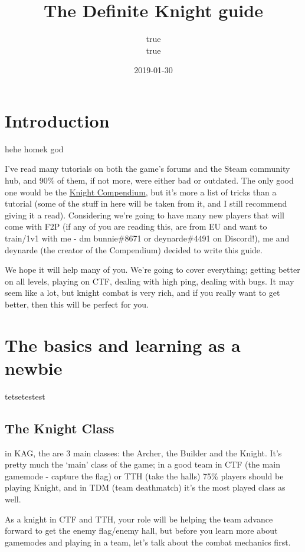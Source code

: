 \documentclass[]{book}
\title{The Definite Knight guide}
\author{true \\ true}
\date{2019-01-30}
\begin{document}
\maketitle

{
\setcounter{tocdepth}{1}
\tableofcontents
}
\chapter{Introduction}\label{introduction}

hehe homek god

I've read many tutorials on both the game's forums and the Steam
community hub, and 90\% of them, if not more, were either bad or
outdated. The only good one would be the
\href{https://deynarde.github.io/kag-knight-compendium/}{Knight
Compendium}, but it's more a list of tricks than a tutorial (some of the
stuff in here will be taken from it, and I still recommend giving it a
read). Considering we're going to have many new players that will come
with F2P (if any of you are reading this, are from EU and want to
train/1v1 with me - dm bunnie\#8671 or deynarde\#4491 on Discord!), me
and deynarde (the creator of the Compendium) decided to write this
guide.

We hope it will help many of you. We're going to cover everything;
getting better on all levels, playing on CTF, dealing with high ping,
dealing with bugs. It may seem like a lot, but knight combat is very
rich, and if you really want to get better, then this will be perfect
for you.

\chapter{The basics and learning as a
newbie}\label{the-basics-and-learning-as-a-newbie}

tetsetestest

\section{The Knight Class}\label{the-knight-class}

in KAG, the are 3 main classes: the Archer, the Builder and the Knight.
It's pretty much the `main' class of the game; in a good team in CTF
(the main gamemode - capture the flag) or TTH (take the halls) 75\%
players should be playing Knight, and in TDM (team deathmatch) it's the
most played class as well.

As a knight in CTF and TTH, your role will be helping the team advance
forward to get the enemy flag/enemy hall, but before you learn more
about gamemodes and playing in a team, let's talk about the combat
mechanics first.
\end{document}
